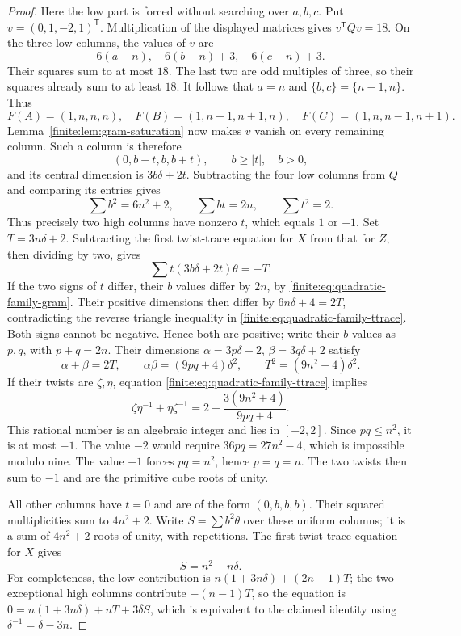 \begin{proof}
Here the low part is forced without searching over $a,b,c$. Put
$v=(0,1,-2,1)^{\mathsf T}$. Multiplication of the displayed matrices gives
$v^{\mathsf T}Qv=18$. On the three low columns, the values of $v$ are
\[
 6(a-n),\quad 6(b-n)+3,\quad6(c-n)+3.
\]
Their squares sum to at most $18$. The last two are odd multiples of three,
so their squares already sum to at least $18$. It follows that
$a=n$ and $\{b,c\}=\{n-1,n\}$. Thus
\[
 F(A)=(1,n,n,n),\quad F(B)=(1,n-1,n+1,n),\quad
 F(C)=(1,n,n-1,n+1).
\]
Lemma~\ref{finite:lem:gram-saturation} now makes $v$ vanish on every
remaining column. Such a column is therefore
\[
 (0,b-t,b,b+t),\qquad b\geq|t|,\quad b>0,
\]
and its central dimension is $3b\delta+2t$. Subtracting the four low columns
from $Q$ and comparing its entries gives
\begin{equation}\label{finite:eq:quadratic-family-gram}
 \sum b^2=6n^2+2,\qquad \sum bt=2n,\qquad\sum t^2=2.
\end{equation}
Thus precisely two high columns have nonzero $t$, which equals $1$ or $-1$.
Set $T=3n\delta+2$. Subtracting the first twist-trace equation for $X$ from
that for $Z$, then dividing by two, gives
\begin{equation}\label{finite:eq:quadratic-family-ttrace}
 \sum t(3b\delta+2t)\theta=-T.
\end{equation}
If the two signs of $t$ differ, their $b$ values differ by $2n$, by
\eqref{finite:eq:quadratic-family-gram}. Their positive dimensions then differ by
$6n\delta+4=2T$, contradicting the reverse triangle inequality in
\eqref{finite:eq:quadratic-family-ttrace}. Both signs cannot be negative. Hence both
are positive; write their $b$ values as $p,q$, with $p+q=2n$.
Their dimensions $\alpha=3p\delta+2$, $\beta=3q\delta+2$ satisfy
\[
 \alpha+\beta=2T,\qquad
 \alpha\beta=(9pq+4)\delta^2,\qquad T^2=(9n^2+4)\delta^2.
\]
If their twists are $\zeta,\eta$, equation
\eqref{finite:eq:quadratic-family-ttrace} implies
\[
 \zeta\eta^{-1}+\eta\zeta^{-1}
 =2-\frac{3(9n^2+4)}{9pq+4}.
\]
This rational number is an algebraic integer and lies in $[-2,2]$.
Since $pq\leq n^2$, it is at most $-1$. The value $-2$ would require
$36pq=27n^2-4$, which is impossible modulo nine. The value $-1$ forces
$pq=n^2$, hence $p=q=n$. The two twists then sum to $-1$ and are the
primitive cube roots of unity.

All other columns have $t=0$ and are of the form $(0,b,b,b)$. Their squared
multiplicities sum to $4n^2+2$. Write $S=\sum b^2\theta$ over these uniform
columns; it is a sum of $4n^2+2$ roots of unity, with repetitions.
The first twist-trace equation for $X$ gives
\[
 S=n^2-n\delta.
\]
For completeness, the low contribution is
$n(1+3n\delta)+(2n-1)T$; the two exceptional high columns contribute
$-(n-1)T$, so the equation is
$0=n(1+3n\delta)+nT+3\delta S$, which is equivalent to the claimed identity
using $\delta^{-1}=\delta-3n$.


\end{proof}
